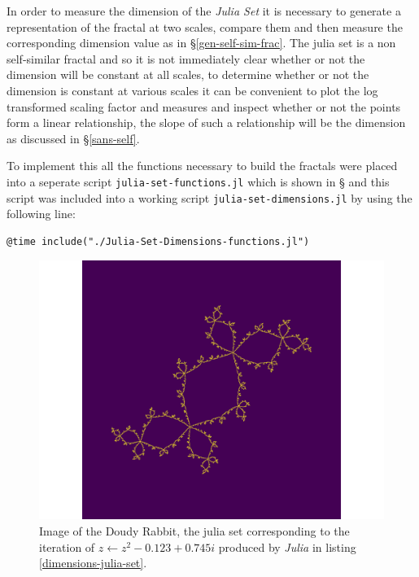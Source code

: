 \documentclass[a4paper,11pt,twoside]{article}
\begin{document}
In order to measure the dimension of the \emph{Julia Set} it is necessary to generate
a representation of the fractal at two scales, compare them and then
measure the corresponding dimension value as in \S \ref{gen-self-sim-frac}. The julia set
is a non self-similar fractal and so it is not immediately clear whether or not
the dimension will be constant at all scales, to determine whether or not the
dimension is constant at various scales it can be convenient to plot the log
transformed scaling factor and measures and inspect whether or not the points
form a linear relationship, the slope of such a relationship will be the
dimension as discussed in \S \ref{sans-self}.

To implement this all the functions necessary to build the fractals were placed
into a seperate script \texttt{julia-set-functions.jl} which is shown in \S
and this script was included into a working script
\texttt{julia-set-dimensions.jl} by using the following line:

\begin{verbatim}
@time include("./Julia-Set-Dimensions-functions.jl")
\end{verbatim}



\begin{figure}[htbp]
\centering
\includegraphics[width=12cm]{media/outline-rabbit.png}
\caption{\label{fig:julia-rab}Image of the Doudy Rabbit, the julia set corresponding to the iteration of \(z \leftarrow z^{2} -0.123+0.745i\) produced by \emph{Julia} in listing \ref{dimensions-julia-set}.}
\end{figure}
\end{document}
